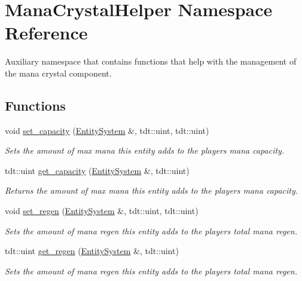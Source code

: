 \hypertarget{namespace_mana_crystal_helper}{}\section{Mana\+Crystal\+Helper Namespace Reference}
\label{namespace_mana_crystal_helper}


Auxiliary namespace that contains functions that help with the management of the mana crystal component.  


\subsection*{Functions}
\begin{DoxyCompactItemize}
\item 
void \hyperlink{namespace_mana_crystal_helper_a5b9c8fd1b52597bf96777c8977f9dc3d}{set\+\_\+capacity} (\hyperlink{class_entity_system}{Entity\+System} \&, tdt\+::uint, tdt\+::uint)
\begin{DoxyCompactList}\small\item\em Sets the amount of max mana this entity adds to the player\textquotesingle{}s mana capacity. \end{DoxyCompactList}\item 
tdt\+::uint \hyperlink{namespace_mana_crystal_helper_ac1028e1e40d4294b0b10d1e674f8a3bd}{get\+\_\+capacity} (\hyperlink{class_entity_system}{Entity\+System} \&, tdt\+::uint)
\begin{DoxyCompactList}\small\item\em Returns the amount of max mana this entity adds to the player\textquotesingle{}s mana capacity. \end{DoxyCompactList}\item 
void \hyperlink{namespace_mana_crystal_helper_ac2af109313543340704cafd3d873ae0c}{set\+\_\+regen} (\hyperlink{class_entity_system}{Entity\+System} \&, tdt\+::uint, tdt\+::uint)
\begin{DoxyCompactList}\small\item\em Sets the amount of mana regen this entity adds to the player\textquotesingle{}s total mana regen. \end{DoxyCompactList}\item 
tdt\+::uint \hyperlink{namespace_mana_crystal_helper_a7ea30d4c10bcfe82a9bdd346bb2fb31e}{get\+\_\+regen} (\hyperlink{class_entity_system}{Entity\+System} \&, tdt\+::uint)
\begin{DoxyCompactList}\small\item\em Sets the amount of mana regen this entity adds to the player\textquotesingle{}s total mana regen. \end{DoxyCompactList}\end{DoxyCompactItemize}


